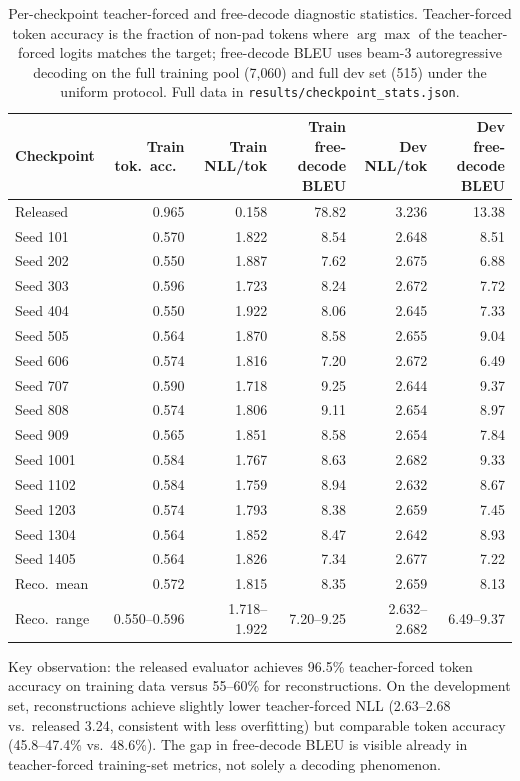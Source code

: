 \documentclass[pdflatex,sn-chicago]{sn-jnl}
\begin{document}
\begin{table}[h]
\centering
\scriptsize\setlength{\tabcolsep}{3pt}
\caption{Per-checkpoint teacher-forced and free-decode diagnostic statistics. Teacher-forced token accuracy is the fraction of non-pad tokens where $\arg\max$ of the teacher-forced logits matches the target; free-decode BLEU uses beam-3 autoregressive decoding on the full training pool (7{,}060) and full dev set (515) under the uniform protocol. Full data in \texttt{results/checkpoint\_stats.json}.}
\label{tab:sanity_checkpoint_stats}
\begin{tabular}{lrrrrr}
\toprule
Checkpoint & Train tok.\ acc.\ & Train NLL/tok & Train free-decode BLEU & Dev NLL/tok & Dev free-decode BLEU \\
\midrule
Released & 0.965 & 0.158 & 78.82 & 3.236 & 13.38 \\
\midrule
Seed 101 & 0.570 & 1.822 & 8.54 & 2.648 & 8.51 \\
Seed 202 & 0.550 & 1.887 & 7.62 & 2.675 & 6.88 \\
Seed 303 & 0.596 & 1.723 & 8.24 & 2.672 & 7.72 \\
Seed 404 & 0.550 & 1.922 & 8.06 & 2.645 & 7.33 \\
Seed 505 & 0.564 & 1.870 & 8.58 & 2.655 & 9.04 \\
Seed 606 & 0.574 & 1.816 & 7.20 & 2.672 & 6.49 \\
Seed 707 & 0.590 & 1.718 & 9.25 & 2.644 & 9.37 \\
Seed 808 & 0.574 & 1.806 & 9.11 & 2.654 & 8.97 \\
Seed 909 & 0.565 & 1.851 & 8.58 & 2.654 & 7.84 \\
Seed 1001 & 0.584 & 1.767 & 8.63 & 2.682 & 9.33 \\
Seed 1102 & 0.584 & 1.759 & 8.94 & 2.632 & 8.67 \\
Seed 1203 & 0.574 & 1.793 & 8.38 & 2.659 & 7.45 \\
Seed 1304 & 0.564 & 1.852 & 8.47 & 2.642 & 8.93 \\
Seed 1405 & 0.564 & 1.826 & 7.34 & 2.677 & 7.22 \\
\midrule
Reco.\ mean & 0.572 & 1.815 & 8.35 & 2.659 & 8.13 \\
Reco.\ range & 0.550--0.596 & 1.718--1.922 & 7.20--9.25 & 2.632--2.682 & 6.49--9.37 \\
\bottomrule
\end{tabular}
\end{table}

Key observation: the released evaluator achieves 96.5\% teacher-forced token accuracy on training data versus 55--60\% for reconstructions. On the development set, reconstructions achieve slightly lower teacher-forced NLL (2.63--2.68 vs.\ released 3.24, consistent with less overfitting) but comparable token accuracy (45.8--47.4\% vs.\ 48.6\%). The gap in free-decode BLEU is visible already in teacher-forced training-set metrics, not solely a decoding phenomenon.
\end{document}
